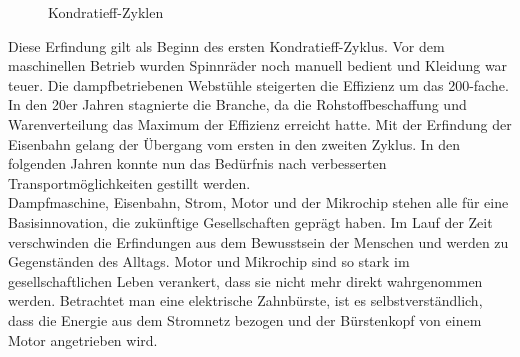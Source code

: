 
\begin{figure}[htbp]
  \vspace{0.5cm}
  \centering
  \caption{Kondratieff-Zyklen \cite[S.32]{hensen:gesundeGesellschaft}}
  \label{zyklen}
  \vspace{0.5cm}
\end{figure}

Diese Erfindung gilt als Beginn des ersten Kondratieff-Zyklus. Vor dem maschinellen Betrieb wurden Spinnräder noch manuell bedient und Kleidung war teuer. Die dampfbetriebenen Webstühle steigerten
die Effizienz um das 200-fache. In den 20er Jahren stagnierte die Branche, da die Rohstoffbeschaffung und Warenverteilung das Maximum der Effizienz erreicht hatte. Mit der Erfindung der Eisenbahn gelang der Übergang vom ersten in den zweiten Zyklus. In den folgenden Jahren konnte nun das Bedürfnis nach verbesserten Transportmöglichkeiten gestillt werden.\\
Dampfmaschine, Eisenbahn, Strom, Motor und der Mikrochip stehen alle für eine Basisinnovation, die zukünftige Gesellschaften geprägt haben. Im Lauf der Zeit verschwinden die Erfindungen aus dem Bewusstsein der Menschen und werden zu Gegenständen des Alltags. Motor und Mikrochip sind so stark im gesellschaftlichen Leben verankert, dass sie nicht mehr direkt wahrgenommen werden. Betrachtet man eine elektrische Zahnbürste, ist es selbstverständlich, dass die Energie aus dem Stromnetz bezogen und der Bürstenkopf von einem Motor angetrieben wird.\\



